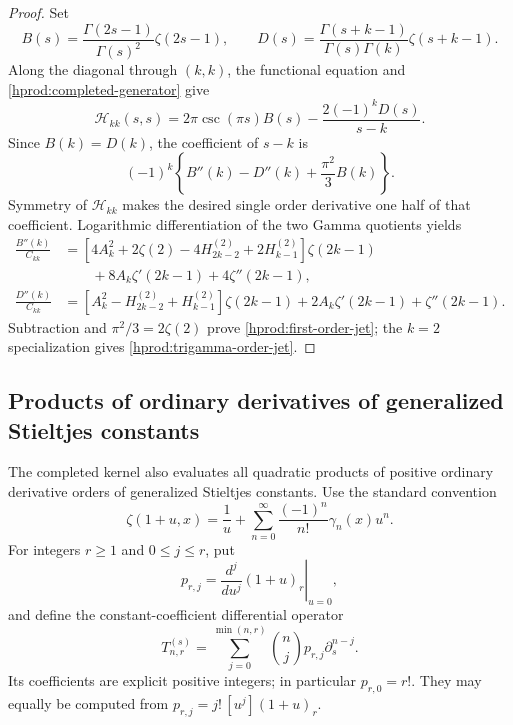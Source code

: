 \documentclass[11pt,a4paper]{article}
\numberwithin{equation}{section}
\theoremstyle{definition}
\theoremstyle{remark}
\begin{document}
\begin{proof}
Set
\[
 B(s)=\frac{\Gamma(2s-1)}{\Gamma(s)^2}\zeta(2s-1),\qquad
 D(s)=\frac{\Gamma(s+k-1)}{\Gamma(s)\Gamma(k)}\zeta(s+k-1).
\]
Along the diagonal through $(k,k)$, the functional equation and
\eqref{hprod:completed-generator} give
\[
 \mathscr H_{kk}(s,s)=2\pi\csc(\pi s)B(s)
                   -\frac{2(-1)^kD(s)}{s-k}.
\]
Since $B(k)=D(k)$, the coefficient of $s-k$ is
\[
 (-1)^k\left\{B''(k)-D''(k)+\frac{\pi^2}{3}B(k)\right\}.
\]
Symmetry of $\mathscr H_{kk}$ makes the desired single order
derivative one half of that coefficient.  Logarithmic differentiation
of the two Gamma quotients yields
\begin{align*}
 \frac{B''(k)}{C_{kk}}
 &=\left[4A_k^2+2\zeta(2)-4H_{2k-2}^{(2)}+2H_{k-1}^{(2)}\right]
       \zeta(2k-1)\\
 &\qquad+8A_k\zeta'(2k-1)+4\zeta''(2k-1),\\
 \frac{D''(k)}{C_{kk}}
 &=\left[A_k^2-H_{2k-2}^{(2)}+H_{k-1}^{(2)}\right]
       \zeta(2k-1)
       +2A_k\zeta'(2k-1)+\zeta''(2k-1).
\end{align*}
Subtraction and $\pi^2/3=2\zeta(2)$ prove
\eqref{hprod:first-order-jet}; the $k=2$ specialization gives
\eqref{hprod:trigamma-order-jet}.
\end{proof}

\subsection{Products of ordinary derivatives of generalized Stieltjes constants}

The completed kernel also evaluates all quadratic products of positive
ordinary derivative orders of generalized Stieltjes constants.  Use the
standard convention
\[
 \zeta(1+u,x)=\frac1u+
 \sum_{n=0}^{\infty}\frac{(-1)^n}{n!}\gamma_n(x)u^n.
\]
For integers $r\ge1$ and $0\le j\le r$, put
\[
 p_{r,j}=\left.\frac{d^j}{du^j}(1+u)_r\right|_{u=0},
\]
and define the constant-coefficient differential operator
\begin{equation}\label{hprod:stieltjes-operator}
 T_{n,r}^{(s)}=
 \sum_{j=0}^{\min(n,r)}\binom nj p_{r,j}\partial_s^{n-j}.
\end{equation}
Its coefficients are explicit positive integers; in particular
$p_{r,0}=r!$.  They may equally be computed from
$p_{r,j}=j!\,[u^j](1+u)_r$.
\end{document}
